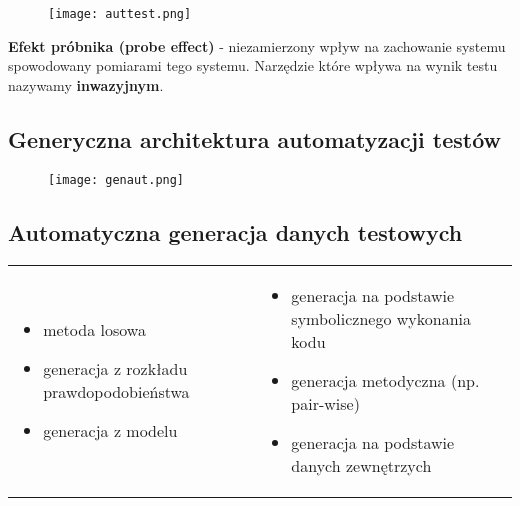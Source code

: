 \documentclass[../main.tex]{subfiles}
\begin{document}
    \begin{figure}[H]
        \texttt{[image: auttest.png]}
    \end{figure}

    \textbf{Efekt próbnika (probe effect)} - niezamierzony wpływ na zachowanie systemu spowodowany pomiarami tego systemu.
    Narzędzie które wpływa na wynik testu nazywamy \textbf{inwazyjnym}.

    \subsection{ Generyczna architektura automatyzacji testów}
    \begin{figure}[H]
        \texttt{[image: genaut.png]}
    \end{figure}

    \subsection{Automatyczna generacja danych testowych}
    \begin{table}[H]
        \begin{center}
            \begin{tabular}{p{8cm} p{8cm}}
                \begin{itemize}
                    \item metoda losowa
                    \item generacja z rozkładu prawdopodobieństwa
                    \item generacja z modelu
                \end{itemize}
                &
                \begin{itemize}
                    \item generacja na podstawie symbolicznego wykonania kodu
                    \item generacja metodyczna (np. pair-wise)
                    \item generacja na podstawie danych zewnętrzych
                \end{itemize}
            \end{tabular}
        \end{center}
    \end{table}
\end{document}

